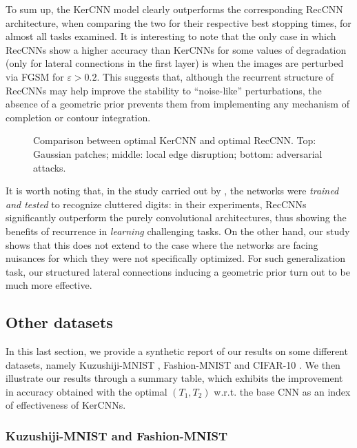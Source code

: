 \documentclass[11pt,oneside,reqno]{amsart}
\begin{document}
 To sum up, the KerCNN model clearly outperforms the corresponding RecCNN architecture, when comparing the two for their respective best stopping times, for almost all tasks examined. It is interesting to note that the only case in which RecCNNs show a higher accuracy than KerCNNs for some values of degradation (only for lateral connections in the first layer) is when the images are perturbed via FGSM for $\varepsilon>0.2$. This suggests that, although the recurrent structure of RecCNNs may help improve the stability to ``noise-like'' perturbations, the absence of a geometric prior prevents them from implementing any mechanism of completion or contour integration. 
 \begin{figure}[htbp!]
  \centering
 \quad
 \caption{Comparison between optimal KerCNN and optimal RecCNN. Top: Gaussian patches; middle: local edge disruption; bottom: adversarial attacks.
}\label{rk}
 \end{figure}
 It is worth noting that, in the study carried out by \citet{spoerer}, the networks were \emph{trained and tested} to recognize cluttered digits: in their experiments, RecCNNs significantly outperform the purely convolutional architectures, thus showing the benefits of recurrence in \emph{learning} challenging tasks. On the other hand, our study shows that this does not extend to the case where the networks are facing nuisances for which they were not specifically optimized. For such generalization task, our structured lateral connections inducing a geometric prior turn out to be much more effective.
 
 \subsection{Other datasets}
 
 In this last section, we provide a synthetic report of our results on some different datasets, namely Kuzushiji-MNIST \citep{kmnist}, Fashion-MNIST \citep{fashion} and CIFAR-10 \citep{cifar}. We then illustrate our results through a summary table, which exhibits the improvement in accuracy obtained with the optimal $(T_1,T_2)$ w.r.t. the base CNN as an index of effectiveness of KerCNNs.
 
 \subsubsection{Kuzushiji-MNIST and Fashion-MNIST}
 
\end{document}
